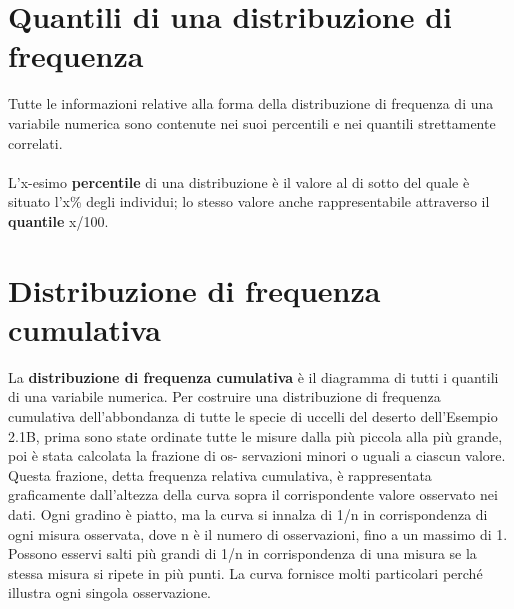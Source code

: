 \documentclass[drafts, 10pt]{book}
\begin{document}
\section{Quantili di una distribuzione di frequenza}
Tutte le informazioni relative alla forma della distribuzione di frequenza di una variabile numerica sono contenute nei suoi percentili e nei quantili strettamente correlati. 
\\
\\
L'x-esimo \textbf{percentile} di una distribuzione è il valore al di sotto del quale è situato l'x\% degli individui; lo stesso valore anche rappresentabile attraverso il \textbf{quantile} x/100.

\section{Distribuzione di frequenza cumulativa}
La \textbf{distribuzione di frequenza cumulativa} è il diagramma di tutti i quantili di una variabile numerica. Per costruire una distribuzione di frequenza cumulativa dell'abbondanza di tutte le specie di uccelli del deserto dell'Esempio 2.1B, prima sono state ordinate tutte le misure dalla più piccola alla più grande, poi è stata calcolata la frazione di os- servazioni minori o uguali a ciascun valore. Questa frazione, detta frequenza relativa cumulativa, è rappresentata graficamente dall'altezza della curva sopra il corrispondente valore osservato nei dati. Ogni gradino è piatto, ma la curva si innalza di 1/n in corrispondenza di ogni misura osservata, dove n è il numero di osservazioni, fino a un massimo di 1. Possono esservi salti più grandi di 1/n in corrispondenza di una misura se la stessa misura si ripete in più punti. La curva fornisce molti particolari perché illustra ogni singola osservazione.
\end{document}
